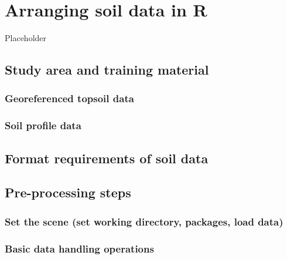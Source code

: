 \documentclass[
  10pt,
  b5paper,
  oneside]{book}
\begin{document}
\hypertarget{arranging-soil-data-in-r}{%
\chapter{\texorpdfstring{Arranging soil data in \textbf{R}}{Arranging soil data in R}}\label{arranging-soil-data-in-r}}

Placeholder

\hypertarget{study-area-and-training-material}{%
\section{Study area and training material}\label{study-area-and-training-material}}

\hypertarget{georeferenced-topsoil-data}{%
\subsection{Georeferenced topsoil data}\label{georeferenced-topsoil-data}}

\hypertarget{soil-profile-data}{%
\subsection{Soil profile data}\label{soil-profile-data}}

\hypertarget{preproc}{%
\section{Format requirements of soil data}\label{preproc}}

\hypertarget{pre-processing-steps}{%
\section{Pre-processing steps}\label{pre-processing-steps}}

\hypertarget{set-the-scene-set-working-directory-packages-load-data}{%
\subsection{Set the scene (set working directory, packages, load data)}\label{set-the-scene-set-working-directory-packages-load-data}}

\hypertarget{basic-data-handling-operations}{%
\subsection{Basic data handling operations}\label{basic-data-handling-operations}}
\end{document}
